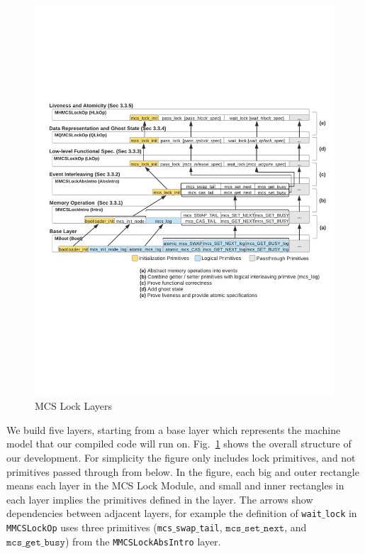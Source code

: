 \begin{figure}
\begin{center}
\includegraphics[width=\linewidth]{figs/mcslock/layer_overview}
\end{center}
\caption{MCS Lock Layers}
\label{fig:layeroverview}
\end{figure}

We build five layers, starting from a base
layer which represents the machine model that our compiled code will
run on.
Fig.~\ref{fig:layeroverview} shows the overall structure of our development.
For simplicity the figure only includes lock primitives, and not
primitives passed through from below.
In the figure, each big and outer rectangle means each layer in the MCS Lock Module, 
and small and inner rectangles in each layer implies the primitives defined in the layer.
The arrows show dependencies between adjacent layers,
for example the definition of \texttt{wait$\_$lock} in \texttt{MMCSLockOp}
uses three primitives (\texttt{mcs$\_$swap$\_$tail},
$\texttt{mcs$\_$set$\_$next}$, and $\texttt{mcs$\_$get$\_$busy}$) from the \texttt{MMCSLockAbsIntro} layer.

